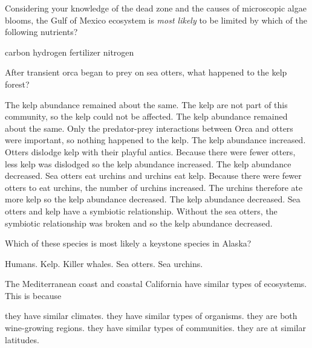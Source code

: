 
\question
Considering your knowledge of the dead zone and the causes of microscopic algae blooms, the Gulf of Mexico ecosystem is \emph{most likely} to be limited by which of the following nutrients?

\begin{choices}
	\choice carbon%
	\choice {}%
	\choice hydrogen%
	\choice fertilizer%
	\correctchoice nitrogen%
\end{choices}


\question
After transient orca began to prey on sea otters, what happened to the kelp forest?

\begin{choices}
	\choice The kelp abundance remained about the same. The kelp are not part of this community, so the kelp could not be affected.%
	\choice The kelp abundance remained about the same. Only the predator-prey interactions between Orca and otters were important, so nothing happened to the kelp.%
	\choice The kelp abundance increased. Otters dislodge kelp with their playful antics.  Because there were fewer otters, less kelp was dislodged so the kelp abundance increased.%
	\correctchoice The kelp abundance decreased. Sea otters eat urchins and urchins eat kelp.  Because there were fewer otters to eat urchins, the number of urchins increased.  The urchins therefore ate more kelp so the kelp abundance decreased.%
	\choice The kelp abundance decreased. Sea otters and kelp have a symbiotic relationship. Without the sea otters, the symbiotic relationship was broken and so the kelp abundance decreased.%
\end{choices}

\question
Which of these species is most likely a keystone species in Alaska?

\begin{choices}
	\choice Humans.  %
	\choice Kelp.  %
	\choice Killer whales. %
	\correctchoice Sea otters. %
	\choice Sea urchins.  %
\end{choices}

\question
The Mediterranean coast and coastal California have similar types of ecosystems. This is because

\begin{choices}
\correctchoice they have similar climates.%
\choice they have similar types of organisms.%
\choice they are both wine-growing regions.%
\choice they have similar types of communities.%
\choice they are at similar latitudes.%
\end{choices}


